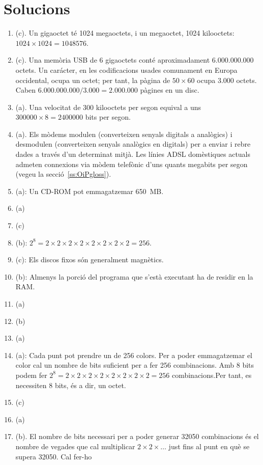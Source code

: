 \section{Solucions}
\begin{enumerate}
\item (c). Un gigaoctet té 1024 megaoctets, i un megaoctet, 1024
  kilooctets: $1024 \times 1024 = 1048576$.
\item (c). Una memòria USB de 6 gigaoctets conté aproximadament 6.000.000.000
  octets. Un carácter, en les codificacions usades comunament en
  Europa occidental, ocupa un octet; per tant, la pàgina de $50\times
  60$ ocupa 3.000 octets. Caben $6.000.000.000/3.000=2.000.000$
  pàgines en un disc.
\item (a). Una velocitat de 300 kilooctets per segon equival a uns
$300000\times 8=2400000$ bits per segon.
\item (a). Els mòdems modulen (converteixen senyals
  digitals a analògics) i desmodulen (converteixen senyals analògics
  en digitals) per a enviar i rebre dades a través d'un determinat mitjà. Les
  línies ADSL domèstiques actuals admeten connexions via mòdem
  telefònic d'uns quants megabits
  per segon (vegeu la secció~\ref{ss:OiPgloss}).
\item (a): Un CD-ROM  pot emmagatzemar 650~MB.
\item (a)
\item (c)
\item (b): $2^8=2\times 2\times 2\times 2\times 2\times 2\times
  2\times 2=256$.
\item (c): Els discos fixos són generalment magnètics. 
\item (b): Almenys la porció del programa que s'està executant ha de
  residir en la RAM.
\item (a) 
\item (b)
\item (a)
\item (a): Cada punt pot prendre un de 256 colors. Per a poder
  emmagatzemar el color cal un nombre de bits suficient per a fer 256
  combinacions. Amb 8 bits podem fer \(2^8=2\times2\times 2\times
  2\times 2\times 2\times 2\times 2=256\) combinacions.Per tant, es necessiten 8 bits, és a dir, un octet.
\item (c)
\item (a)
\item (b). El nombre de bits necessari per a poder generar 32050
  combinacions és el nombre de vegades que cal multiplicar \(2\times
  2\times\ldots\) just fins al punt en què se supera 32050. Cal fer-ho

\end{enumerate}
